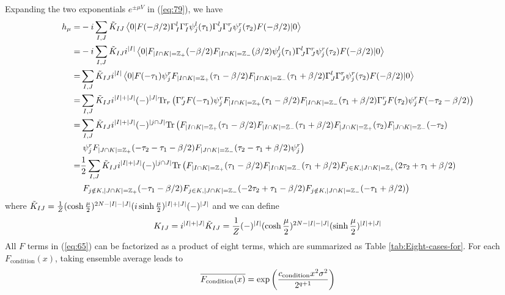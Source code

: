 \documentclass[11pt]{article}
\renewcommand{\>}{\rangle}
\newcommand{\<}{\langle}
\begin{document}
Expanding the two exponentials $e^{\pm\mu V}$ in (\ref{eq:79}),
we have
\begin{align}
h_{\mu}= & -i\sum_{I,J}\tilde{K}_{IJ}\left\langle 0|F(-\beta/2)\Gamma_{I}^{l}\Gamma_{I}^{r}\psi_{j}^{l}(\tau_{1})\Gamma_{J}^{l}\Gamma_{J}^{r}\psi_{j}^{r}(\tau_{2})F(-\beta/2)|0\right\rangle\nonumber \\
= & -i\sum_{I,J}\tilde{K}_{IJ}i^{|I|}\left\langle 0|F_{|I\cap K|=\mathbb{Z}_{+}}(-\beta/2)F_{|I\cap K|=\mathbb{Z}_{-}}(\beta/2)\psi_{j}^{l}(\tau_{1})\Gamma_{J}^{l}\Gamma_{J}^{r}\psi_{j}^{r}(\tau_{2})F(-\beta/2)|0\right\rangle\nonumber \\
= & \sum_{I,J}\tilde{K}_{IJ}i^{|I|}\left\langle 0|F(-\tau_{1})\psi_{j}^{r}F_{|I\cap K|=\mathbb{Z}_{+}}(\tau_{1}-\beta/2)F_{|I\cap K|=\mathbb{Z}_{-}}(\tau_{1}+\beta/2)\Gamma_{J}^{l}\Gamma_{J}^{r}\psi_{j}^{r}(\tau_{2})F(-\beta/2)|0\right\rangle\nonumber \\
= & \sum_{I,J}\tilde{K}_{IJ}i^{|I|+|J|}(-)^{|J|}\text{Tr}_{r}\left(\Gamma_{J}^{r}F(-\tau_{1})\psi_{j}^{r}F_{|I\cap K|=\mathbb{Z}_{+}}(\tau_{1}-\beta/2)F_{|I\cap K|=\mathbb{Z}_{-}}(\tau_{1}+\beta/2)\Gamma_{J}^{r}F(\tau_{2})\psi_{j}^{r}F(-\tau_{2}-\beta/2)\right)\nonumber \\
= & \sum_{I,J}\tilde{K}_{IJ}i^{|I|+|J|}(-)^{|j\cap J|}\text{Tr}\left(F_{|I\cap K|=\mathbb{Z}_{+}}(\tau_{1}-\beta/2)F_{|I\cap K|=\mathbb{Z}_{-}}(\tau_{1}+\beta/2)F_{|J\cap K|=\mathbb{Z}_{+}}(\tau_{2})F_{|J\cap K|=\mathbb{Z}_{-}}(-\tau_{2})\right.\nonumber \\
 & \left.\psi_{j}^{r}F_{|J\cap K|=\mathbb{Z}_{+}}(-\tau_{2}-\tau_{1}-\beta/2)F_{|J\cap K|=\mathbb{Z}_{-}}(\tau_{2}-\tau_{1}+\beta/2)\psi_{j}^{r}\right)\nonumber \\
= & \frac{1}{2}\sum_{I,J}\tilde{K}_{IJ}i^{|I|+|J|}(-)^{|j\cap J|}\text{Tr}\left(F_{|I\cap K|=\mathbb{Z}_{+}}(\tau_{1}-\beta/2)F_{|I\cap K|=\mathbb{Z}_{-}}(\tau_{1}+\beta/2)F_{j\in K,|J\cap K|=\mathbb{Z}_{+}}(2\tau_{2}+\tau_{1}+\beta/2)\right.\nonumber \\
 & \left.F_{j\notin K,|J\cap K|=\mathbb{Z}_{+}}(-\tau_{1}-\beta/2)F_{j\in K,|J\cap K|=\mathbb{Z}_{-}}(-2\tau_{2}+\tau_{1}-\beta/2)F_{j\notin K,|J\cap K|=\mathbb{Z}_{-}}(-\tau_{1}+\beta/2)\right)\label{eq:65}
\end{align}
where $\tilde{K}_{IJ}=\frac{1}{Z}(\cosh\frac{\mu}{2})^{2N-|I|-|J|}(i\sinh\frac{\mu}{2})^{|I|+|J|}(-)^{|J|}$
and we can define
\begin{equation}
K_{IJ}=i^{|I|+|J|}\tilde{K}_{IJ}=\frac{1}{Z}(-)^{|I|}(\cosh\frac{\mu}{2})^{2N-|I|-|J|}(\sinh\frac{\mu}{2})^{|I|+|J|}
\end{equation}
All $F$ terms in (\ref{eq:65}) can be factorized as a product of
eight terms, which are summarized as Table \ref{tab:Eight-cases-for}.
For each $F_{\text{condition}}(x)$, taking ensemble average leads
to
\begin{equation}
\overline{F_{\text{condition}}(x)}=\exp\left(\frac{c_{\text{condition}}x^{2}\sigma^{2}}{2^{q+1}}\right)
\end{equation}
\end{document}
